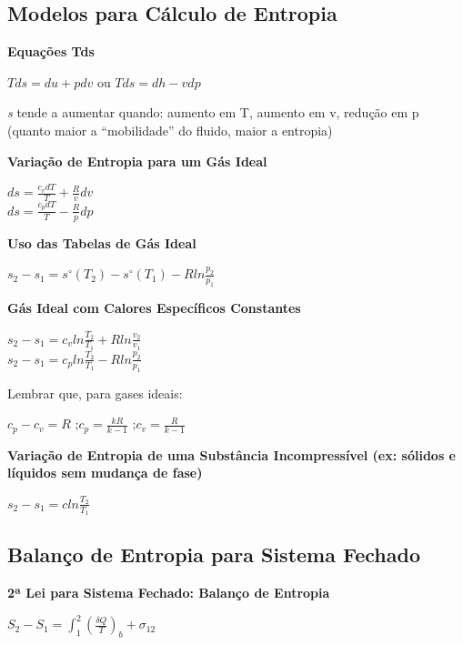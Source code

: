 \documentclass[a4paper, 12pt]{article}
\begin{document}
\subsection{Modelos para Cálculo de Entropia}
\textbf{Equações Tds}
	\begin{center}
		\large
		$ Tds = du + pdv $ ou
		$ Tds = dh  - vdp $
	\end{center}

\textit{s} tende a aumentar quando: aumento em T, aumento em v, redução em p
(quanto maior a “mobilidade” do fluido, maior a entropia)

\textbf{Variação de Entropia para um Gás Ideal}
	\begin{center}
		\large
		$ ds = \frac{c_vdT}{T} + \frac{R}{v}dv $\\
		$ ds = \frac{c_pdT}{T} - \frac{R}{p}dp$
	\end{center}

\textbf{Uso das Tabelas de Gás Ideal}
	\begin{center}
		\large
		$ s_2 - s_1 = s^\circ(T_2) - s^\circ(T_1) - Rln\frac{p_2}{p_1}$
	\end{center}

\textbf{Gás Ideal com Calores Específicos Constantes}
	\begin{center}
		\large
		$ s_2 - s_1 = c_vln\frac{T_2}{T_1} + Rln\frac{v_2}{v_1} $\\
		$ s_2 - s_1 = c_pln\frac{T_2}{T_1} - Rln\frac{p_2}{p_1} $
	\end{center}

Lembrar que, para gases ideais:
	\begin{center}
		\large
		$ c_p - c_v = R $ ;$ c_p = \frac{kR}{k - 1} $ ;$ c_v = \frac{R}{k - 1} $
	\end{center}

\textbf{Variação de Entropia de uma Substância Incompressível (ex: sólidos e líquidos sem mudança de fase)}
	\begin{center}
		\large
		$ s_2 - s_1 = cln\frac{T_2}{T_1} $
	\end{center}

\subsection{Balanço de Entropia para Sistema Fechado}
\textbf{2ª Lei para Sistema Fechado: Balanço de Entropia}
	\begin{center}
		\large
		$ S_2 - S_1 = \int^2_1(\frac{\delta Q}{T})_b + \sigma_{12} $
	\end{center}
\end{document}
